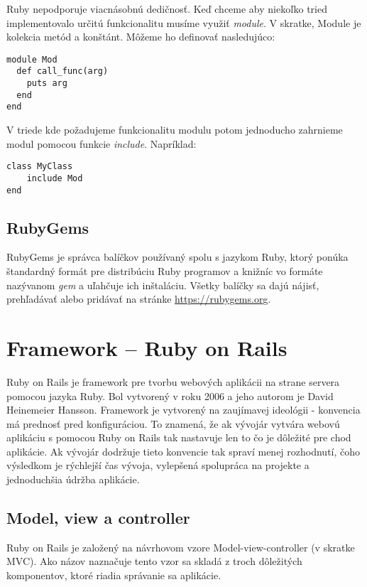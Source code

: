 Ruby nepodporuje viacnásobnú dedičnosť. Keď chceme aby niekoľko tried implementovalo určitú funkcionalitu musíme využiť \emph{module}. V skratke, Module je kolekcia metód a konštánt. Môžeme ho definovať nasledujúco:

\begin{verbatim}
module Mod
  def call_func(arg)
    puts arg
  end
end
\end{verbatim}

V triede kde požadujeme funkcionalitu modulu potom jednoducho zahrnieme modul pomocou funkcie \emph{include}. Napríklad:

\begin{verbatim}
class MyClass
    include Mod
end
\end{verbatim}

\subsection{RubyGems}

RubyGems je správca balíčkov používaný spolu s jazykom Ruby, ktorý ponúka štandardný formát pre distribúciu Ruby programov a knižníc vo formáte nazývanom \emph{gem} a uľahčuje ich inštaláciu. Všetky balíčky sa dajú nájisť, prehľadávať alebo pridávať na stránke \url{https://rubygems.org}.

\section{Framework -- Ruby on Rails}

Ruby on Rails je framework pre tvorbu webových aplikácii na strane servera pomocou jazyka Ruby. Bol vytvorený v roku 2006 a jeho autorom je David Heinemeier Hansson. Framework je vytvorený na zaujímavej ideológii - konvencia má prednosť pred konfiguráciou. To znamená, že ak vývojár vytvára webovú aplikáciu s pomocou Ruby on Rails tak nastavuje len to čo je dôležité pre chod aplikácie.
Ak vývojár dodržuje tieto konvencie tak spraví menej rozhodnutí, čoho výsledkom je rýchlejší čas vývoja, vylepšená spolupráca na projekte a jednoduchšia údržba aplikácie.

\subsection{Model, view a controller}

Ruby on Rails je založený na návrhovom vzore Model-view-controller (v skratke MVC). Ako názov naznačuje tento vzor sa skladá z troch dôležitých komponentov, ktoré riadia správanie sa aplikácie.


